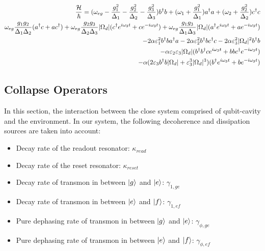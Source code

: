 \begin{equation}\begin{split}
   \frac{\mathcal{H}}{\hbar} = (\omega_{eg}-\frac{g_1^2}{\Delta_1}-\frac{g_2^2}{\Delta_2}-\frac{g_3^2}{\Delta_3})b^\dagger b + (\omega_1+\frac{g_1^2}{\Delta_1})a^\dagger a+ (\omega_2+\frac{g_2^2}{\Delta_2})c^\dagger c  \\
\omega_{eg} \frac{g_1 g_2}{\Delta_1 \Delta_2}(a^\dagger c + a c^\dagger) + \omega_{eg} \frac{g_2 g_3}{\Delta_2 \Delta_3}\lvert \Omega_d \rvert(c^\dagger e^{i\omega_3 t} + c e^{-i\omega_3 t}) +\omega_{eg} \frac{g_1 g_3}{\Delta_1 \Delta_3}\lvert \Omega_d \rvert(a^\dagger e^{i\omega_3 t}+ a e^{-i\omega_3 t}) \\
  -2\alpha \varepsilon_1^2 b^\dagger b a^\dagger a 
	 -2\alpha \varepsilon_2^2 b^\dagger b c^\dagger c 
	 -2\alpha \varepsilon_3^2 \lvert \Omega_d \rvert^2 b^\dagger b \\
-\alpha\varepsilon_2\varepsilon_3\lvert \Omega_d \rvert (b^\dagger b^\dagger c e^{i\omega_3 t} + bbc^\dagger e^{-i\omega_3 t})\\
-\alpha (2\varepsilon_3 b^\dagger b \lvert \Omega_d \rvert + \varepsilon_3^3 \lvert \Omega_d \rvert^3) (b^\dagger e^{i\omega_3 t} +b e^{-i \omega_3 t})
\end{split}
\end{equation}

\subsection{Collapse Operators}

In this section, the interaction between the close system comprised of qubit-cavity and the environment. In our system, the following decoherence and dissipation sources are taken into account:

\begin{itemize}
  \item Decay rate of the readout resonator: $\kappa_{read}$
  \item Decay rate of the reset resonator: $\kappa_{reset}$
  \item Decay rate of transmon in between $\ket{g}$ and $\ket{e}$: $\gamma_{1,ge}$
  \item Decay rate of transmon in between $\ket{e}$ and $\ket{f}$: $\gamma_{1,ef}$
  \item Pure dephasing rate of transmon in between $\ket{g}$ and $\ket{e}$: $\gamma_{\phi,ge}$
  \item Pure dephasing rate of transmon in between $\ket{e}$ and $\ket{f}$: $\gamma_{\phi,ef}$
\end{itemize}


